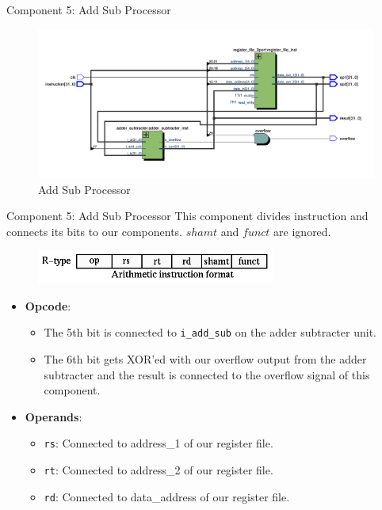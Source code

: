 \documentclass{beamer}
\begin{document}
\begin{frame}{Component 5: Add Sub Processor}
    \begin{figure}[ht]
        \centering
        \includegraphics[width=\textwidth]{./images/add_sub_processor.png}
        \caption{Add Sub Processor}
      \end{figure}
\end{frame}
\begin{frame}{Component 5: Add Sub Processor}
    This component divides instruction and connects its bits to our components. \(shamt\) and \(funct\) are ignored.
\begin{figure}[ht]
    \centering
    \includegraphics[width=0.7\textwidth]{./images/r_type.png}
\end{figure}

\begin{itemize}
    \item \textbf{Opcode}:
    \begin{itemize}
        \item The 5th bit is connected to \texttt{i\_add\_sub} on the adder subtracter unit.
        \item The 6th bit gets XOR'ed with our overflow output from the adder subtracter and the result is connected to the overflow signal of this component.
    \end{itemize}
    \item \textbf{Operands}:
    \begin{itemize}
        \item \texttt{rs}: Connected to address\_1 of our register file.
        \item \texttt{rt}: Connected to address\_2 of our register file.
        \item \texttt{rd}: Connected to data\_address of our register file.
    \end{itemize}
\end{itemize}
\end{frame}
\end{document}
